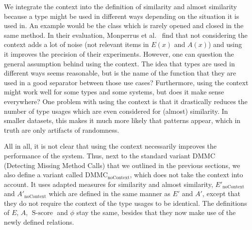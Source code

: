 We integrate the context into the definition of similarity and almost similarity because a type might be used in different ways depending on the situation it is used in.
An example would be the class  which is rarely opened and closed in the same method.
In their evaluation, Monperrus et al.~\cite{monperrus2013detecting} find that not considering the context adds a lot of noise (not relevant items in $E(x)$ and $A(x)$) and using it improves the precision of their experiments.
However, one can question the general assumption behind using the context.
The idea that types are used in different ways seems reasonable, but is the name of the function that they are used in a good separator between those use cases?
Furthermore, using the context might work well for some types and some systems, but does it make sense everywhere?
One problem with using the context is that it drastically reduces the number of type usages which are even considered for (almost) similarity.
In smaller datasets, this makes it much more likely that patterns appear, which in truth are only artifacts of randomness.

All in all, it is not clear that using the context necessarily improves the performance of the system.
Thus, next to the standard variant $\text{DMMC}$ (Detecting Missing Method Calls) that we outlined in the previous sections, we also define a variant called $\text{DMMC}_{\text{noContext}}$, which does not take the context into account.
It uses adapted measures for similarity and almost similarity, $E'_{\text{noContext}}$ and $A'_{\text{noContext}}$ which are defined in the same manner as $E'$ and $A'$, except that they do not require the context of the type usages to be identical.
The definitions of $E$, $A$, $\operatorname{S-score}$ and $\phi$ stay the same, besides that they now make use of the newly defined relations.


